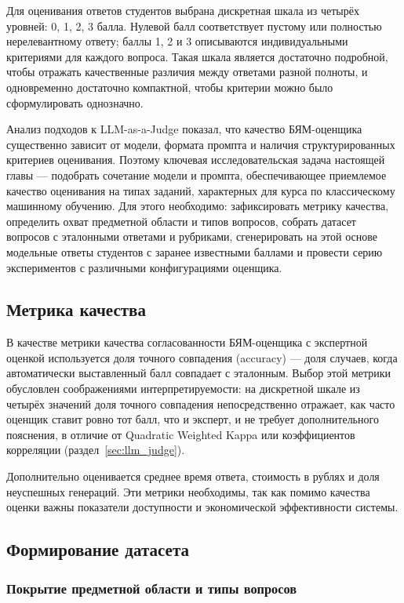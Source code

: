 Для оценивания ответов студентов выбрана дискретная шкала из четырёх уровней:
0, 1, 2, 3 балла. Нулевой балл соответствует пустому или полностью
нерелевантному ответу; баллы 1, 2 и 3 описываются индивидуальными критериями
для каждого вопроса. Такая шкала является достаточно подробной, чтобы отражать
качественные различия между ответами разной полноты, и одновременно достаточно
компактной, чтобы критерии можно было сформулировать однозначно.

Анализ подходов к LLM-as-a-Judge показал, что качество БЯМ-оценщика существенно
зависит от модели, формата промпта и наличия структурированных критериев
оценивания. Поэтому ключевая исследовательская задача настоящей главы ---
подобрать сочетание модели и промпта, обеспечивающее приемлемое качество
оценивания на типах заданий, характерных для курса по классическому машинному
обучению. Для этого необходимо: зафиксировать метрику качества,
определить охват предметной области и типов вопросов, собрать датасет
вопросов с эталонными ответами и рубриками, сгенерировать на этой основе
модельные ответы студентов с заранее известными баллами и провести серию
экспериментов с различными конфигурациями оценщика.

\subsection{Метрика качества}

В качестве метрики качества согласованности БЯМ-оценщика с экспертной оценкой
используется доля точного совпадения (accuracy) ---
доля случаев, когда автоматически выставленный балл совпадает с эталонным.
Выбор этой метрики обусловлен соображениями интерпретируемости: на дискретной
шкале из четырёх значений доля точного совпадения непосредственно отражает,
как часто оценщик ставит ровно тот балл, что и эксперт, и не требует
дополнительного пояснения, в отличие от Quadratic Weighted Kappa или
коэффициентов корреляции (раздел~\ref{sec:llm_judge}).

Дополнительно оценивается среднее время ответа, стоимость в рублях и доля неуспешных генераций.
Эти метрики необходимы, так как помимо качества оценки важны показатели доступности и экономической эффективности системы.
\subsection{Формирование датасета}\label{sec:dataset}

\subsubsection{Покрытие предметной области и типы вопросов}

